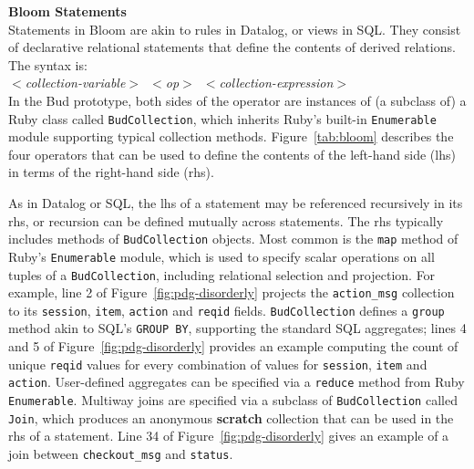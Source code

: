 \textbf{Bloom Statements}\\
\noindent
Statements in Bloom are akin to rules in Datalog, or views in SQL.  They consist of declarative relational statements that define the contents of derived relations.  The syntax is:\\
\noindent
\mbox{\hspace{0.25in}\emph{$<$collection-variable$>$ $<$op$>$ $<$collection-expression$>$}}\\
\noindent
In the Bud prototype, both sides of the operator are instances of (a subclass of) a Ruby class called \texttt{BudCollection}, which inherits Ruby's built-in \texttt{Enumerable} module supporting typical collection methods.  Figure~\ref{tab:bloom} describes the four operators that can be used to define the contents of the left-hand side (lhs) in terms of the right-hand side (rhs).

As in Datalog or SQL, the lhs of a statement may be referenced recursively in its rhs, or recursion can be defined mutually across statements.  The rhs typically includes methods of \texttt{BudCollection} objects.  
Most common is the \texttt{map} method of Ruby's \texttt{Enumerable} module, which is used to specify scalar operations on all tuples of a \texttt{BudCollection}, including relational selection and projection. For example, line 2 of Figure~\ref{fig:pdg-disorderly} projects the \texttt{action\_msg} collection to its \texttt{session}, \texttt{item}, \texttt{action} and \texttt{reqid} fields.  \texttt{BudCollection} defines a \texttt{group} method akin to SQL's \texttt{GROUP BY}, supporting the standard SQL aggregates; lines 4 and 5 of Figure~\ref{fig:pdg-disorderly} 
provides an example computing the count 
of unique \texttt{reqid} values for every combination of values for \texttt{session}, 
\texttt{item} and \texttt{action}.
User-defined aggregates can be specified via a \texttt{reduce} method from Ruby \texttt{Enumerable}.  Multiway joins are specified via a subclass of \texttt{BudCollection} called \texttt{Join}, which produces an anonymous \textbf{scratch} collection that can be used in the rhs of a statement. 
Line 34 of Figure~\ref{fig:pdg-disorderly} gives an example of a join between
\texttt{checkout\_msg} and \texttt{status}.



